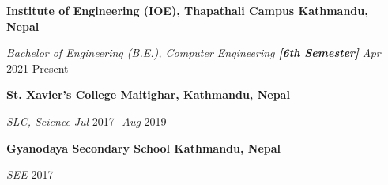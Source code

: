 \textbf{Institute of Engineering (IOE), Thapathali Campus \hfill Kathmandu, Nepal} \par
\textit{Bachelor of Engineering (B.E.), Computer Engineering \textbf{[6th Semester]}} \hfill \textit{Apr}  2021-Present\par

\textbf{St. Xavier's College \hfill Maitighar, Kathmandu, Nepal} \par
\textit{SLC, Science} \hfill \textit{Jul}  2017- \textit{Aug} 2019\par

\textbf{Gyanodaya Secondary School \hfill Kathmandu, Nepal} \par
\textit{SEE} \hfill 2017\par